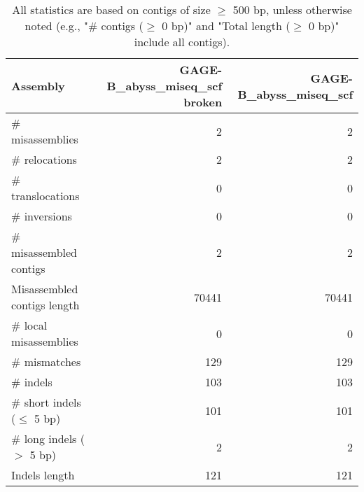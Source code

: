 \documentclass[12pt,a4paper]{article}
\begin{document}
\begin{table}[ht]
\begin{center}
\caption{All statistics are based on contigs of size $\geq$ 500 bp, unless otherwise noted (e.g., "\# contigs ($\geq$ 0 bp)" and "Total length ($\geq$ 0 bp)" include all contigs).}
\begin{tabular}{|l*{2}{|r}|}
\hline
Assembly & GAGE-B\_abyss\_miseq\_scf broken & GAGE-B\_abyss\_miseq\_scf \\ \hline
\# misassemblies & 2 & 2 \\ \hline
\hspace{5mm}\# relocations & 2 & 2 \\ \hline
\hspace{5mm}\# translocations & 0 & 0 \\ \hline
\hspace{5mm}\# inversions & 0 & 0 \\ \hline
\# misassembled contigs & 2 & 2 \\ \hline
Misassembled contigs length & 70441 & 70441 \\ \hline
\# local misassemblies & 0 & 0 \\ \hline
\# mismatches & 129 & 129 \\ \hline
\# indels & 103 & 103 \\ \hline
\hspace{5mm}\# short indels ($\leq$ 5 bp) & 101 & 101 \\ \hline
\hspace{5mm}\# long indels ($>$ 5 bp) & 2 & 2 \\ \hline
Indels length & 121 & 121 \\ \hline
\end{tabular}
\end{center}
\end{table}
\end{document}
